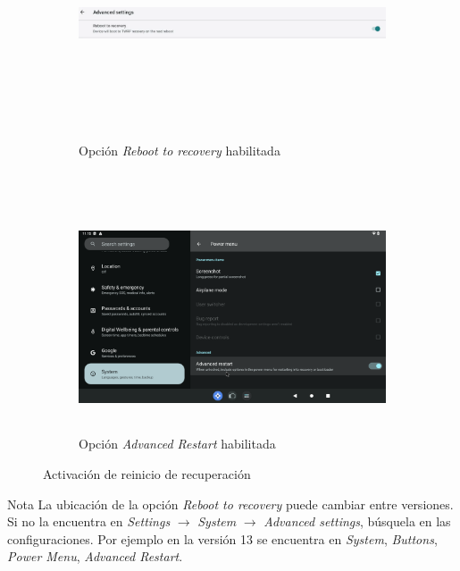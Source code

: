 \documentclass[letterpaper,10.5pt]{article}
\begin{document}
\begin{figure}[H]
	\centering
	\begin{subfigure}{\linewidth}
		\centering
		\includegraphics[width=0.9\linewidth,height=68mm,keepaspectratio]{img/p02-05-recovery-boot.png} %
		\caption{Opción \emph{Reboot to recovery} habilitada}%
		\label{fig:recovery-boot} %
	\end{subfigure}\\%
	\begin{subfigure}{\linewidth}
		\centering
		\includegraphics[width=0.9\linewidth,height=68mm,keepaspectratio]{img/p02-05-advanced-restart.png} %
		\caption{Opción \emph{Advanced Restart} habilitada}%
		\label{fig:advanced-restart} %
	\end{subfigure}
	\caption{Activación de reinicio de recuperación}%
	\label{fig:recovery-restart} %
\end{figure}

\medskip{}
\begin{greenbox}{Nota}
La ubicación de la opción \emph{Reboot to recovery} puede cambiar entre versiones.
Si no la encuentra en \emph{Settings} \(\rightarrow{}\) \emph{System} \(\rightarrow{}\) \emph{Advanced settings}, búsquela en las configuraciones.
Por ejemplo en la versión 13 se encuentra en \emph{System}, \emph\emph{Buttons}, \emph{Power Menu}, \emph{Advanced Restart}.
\end{greenbox}
\medskip{}
\end{document}
